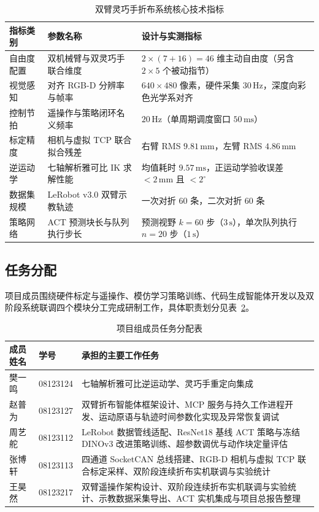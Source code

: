 \begin{table}[htbp]
\centering
\caption{双臂灵巧手折布系统核心技术指标}
\label{tab:system-metrics}
\footnotesize
\setlength{\tabcolsep}{4pt}
\begin{tabular}{@{}llp{8.4cm}@{}}
  \toprule
  指标类别 & 参数名称 & 设计与实测指标 \\
  \midrule
  自由度配置 & 双机械臂与双灵巧手联合维度 & $2\times(7 + 16) = 46$ 维主动自由度（另含 $2\times 5$ 个被动指节） \\
  视觉感知 & 对齐 RGB-D 分辨率与帧率 & $640\times 480$ 像素，硬件采集 $30\,\mathrm{Hz}$，深度向彩色光学系对齐 \\
  控制节拍 & 遥操作与策略闭环名义频率 & $20\,\mathrm{Hz}$（单周期调度窗口 $50\,\mathrm{ms}$） \\
  标定精度 & 相机与虚拟 TCP 联合拟合残差 & 右臂 RMS $9.81\,\mathrm{mm}$，左臂 RMS $4.86\,\mathrm{mm}$ \\
  逆运动学 & 七轴解析雅可比 IK 求解性能 & 均值耗时 $9.57\,\mathrm{ms}$，正运动学验收误差 $<2\,\mathrm{mm}$ 且 $<2^{\circ}$ \\
  数据集规模 & LeRobot v3.0 双臂示教轨迹 & 一次对折 60 条，二次对折 60 条 \\
  策略网络 & ACT 预测块长与队列执行步长 & 预测视野 $k=60$ 步（$3\,\mathrm{s}$），单次队列执行 $n=20$ 步（$1\,\mathrm{s}$） \\
  \bottomrule
\end{tabular}
\end{table}


\subsection{任务分配}
\label{subsec:task-allocation}

项目成员围绕硬件标定与遥操作、模仿学习策略训练、代码生成智能体开发以及双阶段系统联调四个模块分工完成研制工作，具体职责划分见表~\ref{tab:team-roles}。

\begin{table}[htbp]
\centering
\caption{项目组成员任务分配表}
\label{tab:team-roles}
\small
\begin{tabular}{@{}llp{9.2cm}@{}}
  \toprule
  成员姓名 & 学号 & 承担的主要工作任务 \\
  \midrule
  樊一鸣 & 08123124 & 七轴解析雅可比逆运动学、灵巧手重定向集成 \\
  赵普为 & 08123127 & 双臂折布智能体框架设计、MCP 服务与持久工作进程开发、运动原语与轨迹时间参数化实现及异常恢复调试 \\
  周艺舵 & 08123112 & LeRobot 数据管线适配、ResNet18 基线 ACT 策略与冻结 DINOv3 改进策略训练、超参数调优与动作块定量评估 \\
  张博轩 & 08123113 & 四通道 SocketCAN 总线搭建、RGB-D 相机与虚拟 TCP 联合标定采样、双阶段连续折布实机联调与实验统计 \\
  王昊然 & 08123217 & 双臂遥操作架构设计、双阶段连续折布实机联调与实验统计、示教数据采集导出、ACT 实机集成与项目总报告整理 \\
  \bottomrule
\end{tabular}
\end{table}



